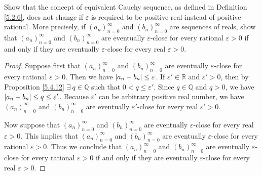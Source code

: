 \begin{exercise}\label{ex 6.1.10}
Show that the concept of equivalent Cauchy sequence, as defined in Definition \ref{5.2.6}, does not change if \(\varepsilon\) is required to be positive real instead of positive rational.
More precisely, if \((a_n)_{n = 0}^\infty\) and \((b_n)_{n = 0}^\infty\) are sequences of reals, show that \((a_n)_{n = 0}^\infty\) and \((b_n)_{n = 0}^\infty\) are eventually \(\varepsilon\)-close for every rational \(\varepsilon > 0\) if and only if they are eventually \(\varepsilon\)-close for every real \(\varepsilon > 0\).
\end{exercise}

\begin{proof}
Suppose first that \((a_n)_{n = 0}^\infty\) and \((b_n)_{n = 0}^\infty\) are eventually \(\varepsilon\)-close for every rational \(\varepsilon > 0\).
Then we have \(\abs*{a_n - b_n} \leq \varepsilon\).
If \(\varepsilon' \in \mathds{R}\) and \(\varepsilon' > 0\), then by Proposition \ref{5.4.12} \(\exists\ q \in \mathds{Q}\) such that \(0 < q \leq \varepsilon'\).
Since \(q \in \mathds{Q}\) and \(q > 0\), we have \(\abs*{a_n - b_n} \leq q \leq \varepsilon'\).
Because \(\varepsilon'\) can be arbitrary positive real number, we have \((a_n)_{n = 0}^\infty\) and \((b_n)_{n = 0}^\infty\) are eventually \(\varepsilon'\)-close for every real \(\varepsilon' > 0\).

Now suppose that \((a_n)_{n = 0}^\infty\) and \((b_n)_{n = 0}^\infty\) are eventually \(\varepsilon\)-close for every real \(\varepsilon > 0\).
This implies that \((a_n)_{n = 0}^\infty\) and \((b_n)_{n = 0}^\infty\) are eventually \(\varepsilon\)-close for every rational \(\varepsilon > 0\).
Thus we conclude that \((a_n)_{n = 0}^\infty\) and \((b_n)_{n = 0}^\infty\) are eventually \(\varepsilon\)-close for every rational \(\varepsilon > 0\) if and only if they are eventually \(\varepsilon\)-close for every real \(\varepsilon > 0\).
\end{proof}